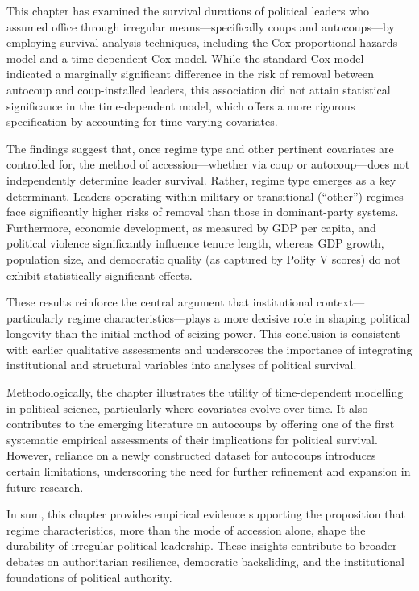 \documentclass[
  12pt,
]{report}
\begin{document}
This chapter has examined the survival durations of political leaders
who assumed office through irregular means---specifically coups and
autocoups---by employing survival analysis techniques, including the Cox
proportional hazards model and a time-dependent Cox model. While the
standard Cox model indicated a marginally significant difference in the
risk of removal between autocoup and coup-installed leaders, this
association did not attain statistical significance in the
time-dependent model, which offers a more rigorous specification by
accounting for time-varying covariates.

The findings suggest that, once regime type and other pertinent
covariates are controlled for, the method of accession---whether via
coup or autocoup---does not independently determine leader survival.
Rather, regime type emerges as a key determinant. Leaders operating
within military or transitional (``other'') regimes face significantly
higher risks of removal than those in dominant-party systems.
Furthermore, economic development, as measured by GDP per capita, and
political violence significantly influence tenure length, whereas GDP
growth, population size, and democratic quality (as captured by Polity V
scores) do not exhibit statistically significant effects.

These results reinforce the central argument that institutional
context---particularly regime characteristics---plays a more decisive
role in shaping political longevity than the initial method of seizing
power. This conclusion is consistent with earlier qualitative
assessments and underscores the importance of integrating institutional
and structural variables into analyses of political survival.

Methodologically, the chapter illustrates the utility of time-dependent
modelling in political science, particularly where covariates evolve
over time. It also contributes to the emerging literature on autocoups
by offering one of the first systematic empirical assessments of their
implications for political survival. However, reliance on a newly
constructed dataset for autocoups introduces certain limitations,
underscoring the need for further refinement and expansion in future
research.

In sum, this chapter provides empirical evidence supporting the
proposition that regime characteristics, more than the mode of accession
alone, shape the durability of irregular political leadership. These
insights contribute to broader debates on authoritarian resilience,
democratic backsliding, and the institutional foundations of political
authority.
\end{document}
